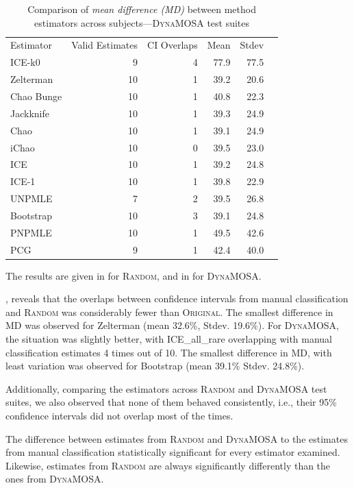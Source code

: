 \documentclass[sigconf,review,anonymous]{acmart}
\newcommand{\ICEallrare}{ICE-k0\xspace}
\newcommand{\Zelterman}{Zelterman\xspace}
\newcommand{\ChaoBunge}{Chao Bunge\xspace}
\newcommand{\Jackknife}{Jackknife\xspace}
\newcommand{\Chao}{Chao\xspace}
\newcommand{\improvedChao}{iChao\xspace}
\newcommand{\ICE}{ICE\xspace}
\newcommand{\improvedICE}{ICE-1\xspace}
\newcommand{\Unpmle}{UNPMLE\xspace}
\newcommand{\Bootstrap}{Bootstrap\xspace}
\newcommand{\Pnpmle}{PNPMLE\xspace}
\newcommand{\PCG}{PCG\xspace}
\newcommand{\original}{\textsc{Original}\xspace}
\newcommand{\EvosuiteRandom}{\textsc{Random}\xspace}
\newcommand{\EvosuiteDynamosa}{\textsc{DynaMOSA}\xspace}
\begin{document}
\begin{table}
\caption{Comparison of \emph{mean difference (MD)} between method
estimators across subjects---\EvosuiteDynamosa test suites}
\begin{tabular}{|l|r|r|r|r|r|}
Estimator	&Valid Estimates	&CI Overlaps	&Mean	&Stdev	\\
\ICEallrare	&	9	&	4	&77.9	&	77.5\\
\Zelterman	&	10	&	1	&39.2	&	20.6\\
\ChaoBunge	&	10	&	1	&40.8	&	22.3\\
\Jackknife	&	10	&	1	&39.3	&	24.9\\
\Chao	&	10	&	1	&39.1	&	24.9\\
\improvedChao	&	10	&	0	&39.5	&	23.0\\
\ICE	&	10	&	1	&39.2	&	24.8\\
\improvedICE	&	10	&	1	&39.8	&	22.9\\
\Unpmle	&	7	&	2	&39.5	&	26.8\\
\Bootstrap	&	10	&	3	&39.1	&	24.8\\
\Pnpmle	&	10	&	1	&49.5	&	42.6\\
\PCG	&	9	&	1	&42.4	&	40.0\\
\end{tabular}
\label{tbl:estdynamosa}
\end{table}
The results are given in  for \EvosuiteRandom, and in
 for \EvosuiteDynamosa.

, reveals that the overlaps between confidence intervals
from manual classification and \EvosuiteRandom was considerably fewer than \original.
The smallest difference in MD was observed for \Zelterman
(mean 32.6\%, Stdev. 19.6\%).
%
For \EvosuiteDynamosa, the situation was slightly better, with ICE\_all\_rare
overlapping with manual classification estimates 4 times out of 10.
The smallest difference in MD, with least variation was observed for
Bootstrap (mean 39.1\% Stdev. 24.8\%).

Additionally, comparing the estimators across \EvosuiteRandom and \EvosuiteDynamosa
test suites, we also observed that none of them behaved consistently, i.e.,
their 95\% confidence intervals did not overlap most of the times.

\begin{tcolorbox}[boxrule=0.5pt, arc=4pt, boxsep=0pt, width=\columnwidth]
The difference between estimates from \EvosuiteRandom and \EvosuiteDynamosa
to the estimates from manual classification statistically significant for every estimator examined.
Likewise, estimates from \EvosuiteRandom are always significantly differently
than the ones from \EvosuiteDynamosa.
\end{tcolorbox}
\end{document}
